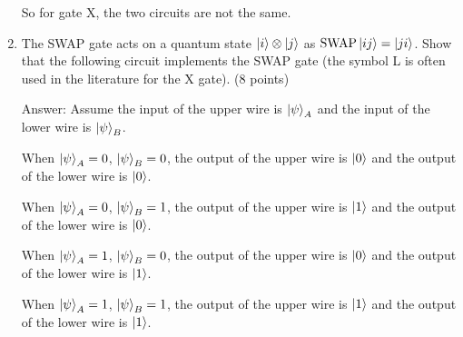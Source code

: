 \documentclass{article}
\begin{document}
\begin{enumerate}
    So for gate X, the two circuits are not the same.

    \item The SWAP gate acts on a quantum state $\ket{i} \otimes \ket{j}$ as $\text{SWAP} \ket{ij} = \ket{ji}$. Show that the following circuit implements the SWAP gate (the symbol L is often used in the literature for the X gate). (8 points)
    
    Answer: Assume the input of the upper wire is $\ket{\psi}_A$ and the input of the lower wire is $\ket{\psi}_B$.
    
    When $\ket{\psi}_A=0$, $\ket{\psi}_B=0$, the output of the upper wire is $\ket{0}$ and the output of the lower wire is $\ket{0}$.
    
    When $\ket{\psi}_A=0$, $\ket{\psi}_B=1$, the output of the upper wire is $\ket{1}$ and the output of the lower wire is $\ket{0}$.
    
    When $\ket{\psi}_A=1$, $\ket{\psi}_B=0$, the output of the upper wire is $\ket{0}$ and the output of the lower wire is $\ket{1}$.
    
    When $\ket{\psi}_A=1$, $\ket{\psi}_B=1$, the output of the upper wire is $\ket{1}$ and the output of the lower wire is $\ket{1}$.
\end{enumerate}
\end{document}
